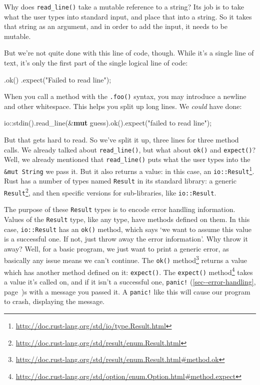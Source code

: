 \documentclass[a4paper,]{book}
\renewcommand*{\hyperref}[2][\ar]{%
  \def\ar{#2}%
  #2 (\autoref{#1}, page~\pageref{#1})}
\newenvironment{Shaded}{\begin{snugshade}}{\end{snugshade}}
\newcommand{\KeywordTok}[1]{\textcolor[rgb]{0.13,0.29,0.53}{\textbf{{#1}}}}
\newcommand{\StringTok}[1]{\textcolor[rgb]{0.31,0.60,0.02}{{#1}}}
\newcommand{\NormalTok}[1]{{#1}}
\renewcommand{\href}[2]{#2\footnote{\url{#1}}}
\begin{document}
Why does \texttt{read\_line()} take a mutable reference to a string? Its
job is to take what the user types into standard input, and place that
into a string. So it takes that string as an argument, and in order to
add the input, it needs to be mutable.

But we're not quite done with this line of code, though. While it's a
single line of text, it's only the first part of the single logical line
of code:

\begin{Shaded}
\begin{Highlighting}[]
        \NormalTok{.ok()}
        \NormalTok{.expect(}\StringTok{"Failed to read line"}\NormalTok{);}
\end{Highlighting}
\end{Shaded}

When you call a method with the \texttt{.foo()} syntax, you may
introduce a newline and other whitespace. This helps you split up long
lines. We \emph{could} have done:

\begin{Shaded}
\begin{Highlighting}[]
    \NormalTok{io::stdin().read_line(&}\KeywordTok{mut} \NormalTok{guess).ok().expect(}\StringTok{"failed to read line"}\NormalTok{);}
\end{Highlighting}
\end{Shaded}

But that gets hard to read. So we've split it up, three lines for three
method calls. We already talked about \texttt{read\_line()}, but what
about \texttt{ok()} and \texttt{expect()}? Well, we already mentioned
that \texttt{read\_line()} puts what the user types into the
\texttt{\&mut\ String} we pass it. But it also returns a value: in this
case, an
\href{http://doc.rust-lang.org/std/io/type.Result.html}{\texttt{io::Result}}.
Rust has a number of types named \texttt{Result} in its standard
library: a generic
\href{http://doc.rust-lang.org/std/result/enum.Result.html}{\texttt{Result}},
and then specific versions for sub-libraries, like \texttt{io::Result}.

The purpose of these \texttt{Result} types is to encode error handling
information. Values of the \texttt{Result} type, like any type, have
methods defined on them. In this case, \texttt{io::Result} has an
\texttt{ok()} method, which says `we want to assume this value is a
successful one. If not, just throw away the error information'. Why
throw it away? Well, for a basic program, we just want to print a
generic error, as basically any issue means we can't continue. The
\href{http://doc.rust-lang.org/std/result/enum.Result.html\#method.ok}{\texttt{ok()}
method} returns a value which has another method defined on it:
\texttt{expect()}. The
\href{http://doc.rust-lang.org/std/option/enum.Option.html\#method.expect}{\texttt{expect()}
method} takes a value it's called on, and if it isn't a successful one,
\hyperref[sec--error-handling]{\texttt{panic!}}s with a message you
passed it. A \texttt{panic!} like this will cause our program to crash,
displaying the message.
\end{document}
